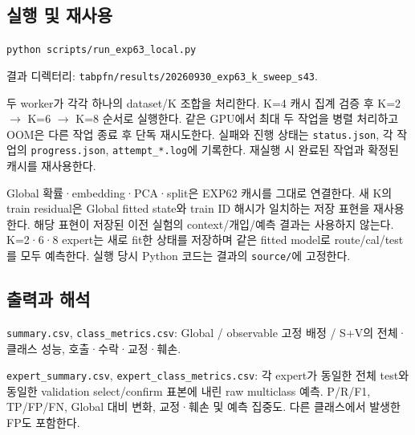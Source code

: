 \subsection{실행 및 재사용}
\texttt{python s\allowbreak{}cripts/\allowbreak{}\allowbreak{}r\allowbreak{}un\_\allowbreak{}\allowbreak{}exp63\allowbreak{}\_\allowbreak{}\allowbreak{}local.\allowbreak{}p\allowbreak{}y}

결과 디렉터리: \texttt{tabpfn/\allowbreak{}\allowbreak{}r\allowbreak{}esults/\allowbreak{}\allowbreak{}2\allowbreak{}0260930\_\allowbreak{}\allowbreak{}exp63\_\allowbreak{}\allowbreak{}k\_\allowbreak{}\allowbreak{}sweep\_\allowbreak{}\allowbreak{}s4\allowbreak{}3}.

두 worker가 각각 하나의 dataset/\allowbreak{}K 조합을 처리한다. K=\allowbreak{}4 캐시 집계 검증 후 K=\allowbreak{}2  \ensuremath{\rightarrow}  K=\allowbreak{}6  \ensuremath{\rightarrow}  K=\allowbreak{}8 순서로 실행한다. 같은 GPU에서 최대 두 작업을 병렬 처리하고 OOM은 다른 작업 종료 후 단독 재시도한다. 실패와 진행 상태는 \texttt{status.\allowbreak{}j\allowbreak{}son}, 각 작업의 \texttt{progress\allowbreak{}.\allowbreak{}json}, \texttt{attempt\_\allowbreak{}\allowbreak{}*.\allowbreak{}log}에 기록한다. 재실행 시 완료된 작업과 확정된 캐시를 재사용한다.

Global 확률·embedding·PCA·split은 EXP62 캐시를 그대로 연결한다. 새 K의 train residual은 Global fitted state와 train ID 해시가 일치하는 저장 표현을 재사용한다. 해당 표현이 저장된 이전 실험의 context/\allowbreak{}개입/\allowbreak{}예측 결과는 사용하지 않는다. K=\allowbreak{}2·6·8 expert는 새로 fit한 상태를 저장하며 같은 fitted model로 route/\allowbreak{}cal/\allowbreak{}test를 모두 예측한다. 실행 당시 Python 코드는 결과의 \texttt{source/\allowbreak{}\allowbreak{}}에 고정한다.

\subsection{출력과 해석}
\par\noindent \textbullet\enspace \texttt{summary.\allowbreak{}csv}, \texttt{class\_\allowbreak{}\allowbreak{}me\allowbreak{}trics.\allowbreak{}cs\allowbreak{}v}: Global /\allowbreak{} observable 고정 배정 /\allowbreak{} S+\allowbreak{}V의 전체·클래스 성능, 호출·수락·교정·훼손.


\par\noindent \textbullet\enspace \texttt{expert\_\allowbreak{}\allowbreak{}s\allowbreak{}ummary.\allowbreak{}c\allowbreak{}sv}, \texttt{expert\_\allowbreak{}\allowbreak{}c\allowbreak{}lass\_\allowbreak{}\allowbreak{}met\allowbreak{}rics.\allowbreak{}csv\allowbreak{}}: 각 expert가 동일한 전체 test와 동일한 validation select/\allowbreak{}confirm 표본에 내린 raw multiclass 예측. P/\allowbreak{}R/\allowbreak{}F1, TP/\allowbreak{}FP/\allowbreak{}FN, Global 대비 변화, 교정·훼손 및 예측 집중도. 다른 클래스에서 발생한 FP도 포함한다.


